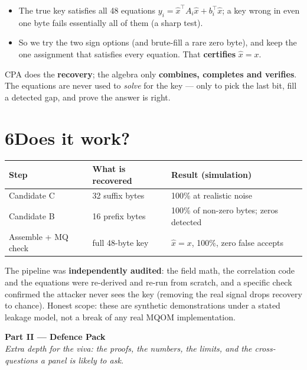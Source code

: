 \documentclass[11pt]{article}
\begin{document}
\begin{itemize}
\item The true key satisfies all 48 equations $y_i = \hat x^{\!\top}A_i\hat x + b_i^{\!\top}\hat x$;
a key wrong in even one byte fails essentially all of them (a sharp test).
\item So we try the two sign options (and brute-fill a rare zero byte), and keep the one
assignment that satisfies every equation. That \textbf{certifies} $\hat x = x$.
\end{itemize}

\begin{keybox}
CPA does the \textbf{recovery}; the algebra only \textbf{combines, completes and verifies}.
The equations are never used to \emph{solve} for the key --- only to pick the last bit, fill a
detected gap, and prove the answer is right.
\end{keybox}

\section*{6\quad Does it work?}
\begin{center}\small
\begin{tabular}{@{}lll@{}}
\toprule
Step & What is recovered & Result (simulation) \\
\midrule
Candidate C & 32 suffix bytes & 100\% at realistic noise \\
Candidate B & 16 prefix bytes & 100\% of non-zero bytes; zeros detected \\
Assemble + MQ check & full 48-byte key & $\hat x = x$, 100\%, zero false accepts \\
\bottomrule
\end{tabular}
\end{center}

\noindent The pipeline was \textbf{independently audited}: the field math, the correlation
code and the equations were re-derived and re-run from scratch, and a specific check confirmed
the attacker never sees the key (removing the real signal drops recovery to chance). Honest
scope: these are synthetic demonstrations under a stated leakage model, not a break of any real
MQOM implementation.

\clearpage
\begin{center}
{\Large\bfseries Part II --- Defence Pack}\\[2pt]
\small\textit{Extra depth for the viva: the proofs, the numbers, the limits, and the
cross-questions a panel is likely to ask.}
\end{center}
\vspace{2mm}
\end{document}
